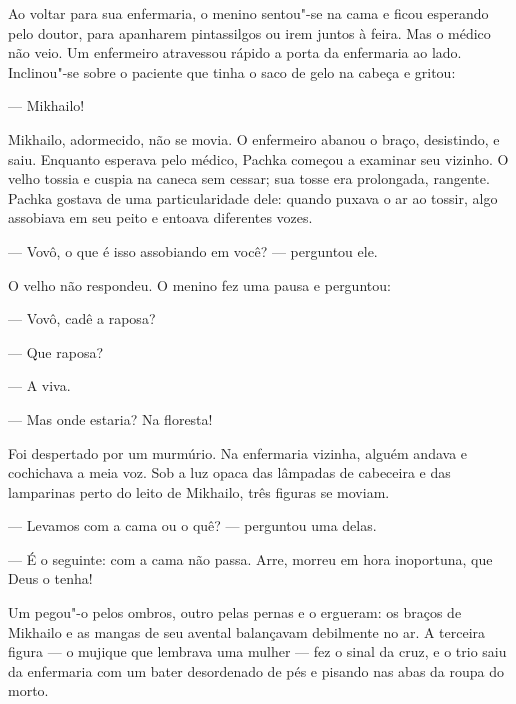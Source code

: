 Ao voltar para sua enfermaria, o menino sentou"-se na cama e ficou
esperando pelo doutor, para apanharem pintassilgos ou irem juntos à
feira. Mas o médico não veio. Um enfermeiro atravessou rápido a porta da
enfermaria ao lado. Inclinou"-se sobre o paciente que tinha o saco de
gelo na cabeça e gritou:

--- Mikhailo!

Mikhailo, adormecido, não se movia. O enfermeiro abanou o braço,
desistindo, e saiu. Enquanto esperava pelo médico, Pachka começou a
examinar seu vizinho. O velho tossia e cuspia na caneca sem cessar; sua
tosse era prolongada, rangente. Pachka gostava de uma particularidade
dele: quando puxava o ar ao tossir, algo assobiava em seu peito e
entoava diferentes vozes.

--- Vovô, o que é isso assobiando em você? --- perguntou ele.

O velho não respondeu. O menino fez uma pausa e perguntou:

--- Vovô, cadê a raposa?

--- Que raposa?

--- A viva.

--- Mas onde estaria? Na floresta!


Foi despertado por um murmúrio. Na enfermaria vizinha, alguém andava e
cochichava a meia voz. Sob a luz opaca das lâmpadas de cabeceira e das
lamparinas perto do leito de Mikhailo, três figuras se moviam.

--- Levamos com a cama ou o quê? --- perguntou uma delas.

--- É o seguinte: com a cama não passa. Arre, morreu em hora inoportuna,
que Deus o tenha!

Um pegou"-o pelos ombros, outro pelas pernas e o ergueram: os braços de
Mikhailo e as mangas de seu avental balançavam debilmente no ar. A
terceira figura --- o mujique que lembrava uma mulher --- fez o sinal da
cruz, e o trio saiu da enfermaria com um bater desordenado de pés e
pisando nas abas da roupa do morto.

